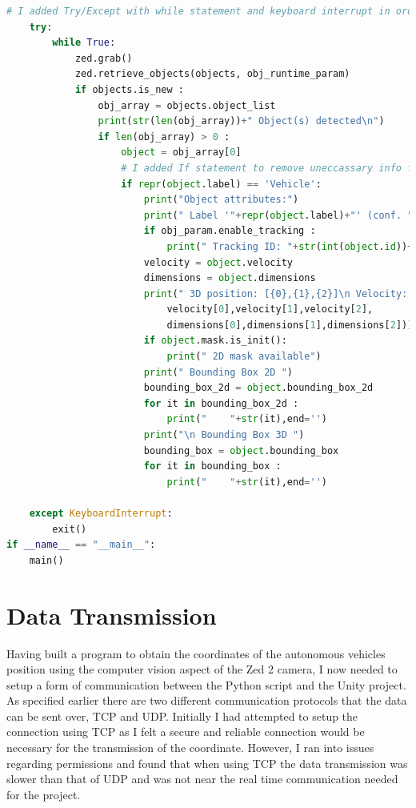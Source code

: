 \documentclass{l4proj}
\begin{document}
\begin{lstlisting}[language=python, float, caption={Python Vehicle Detection Code Part 2, Original Code Without Edits Copyright (c) 2022, STEREOLABS.}, label={lst:code2}]
 # I added Try/Except with while statement and keyboard interrupt in order to allow the script to run indefinitely. 
    try:
        while True:
            zed.grab()
            zed.retrieve_objects(objects, obj_runtime_param)
            if objects.is_new :
                obj_array = objects.object_list
                print(str(len(obj_array))+" Object(s) detected\n")
                if len(obj_array) > 0 :
                    object = obj_array[0]
                    # I added If statement to remove uneccassary info from labels other 'Vehicle'.
                    if repr(object.label) == 'Vehicle':
                        print("Object attributes:")
                        print(" Label '"+repr(object.label)+"' (conf. "+str(int(object.confidence))+"/100)")
                        if obj_param.enable_tracking :
                            print(" Tracking ID: "+str(int(object.id))+" tracking state: "+repr(object.tracking_state)+" / "+repr(object.action_state))
                        velocity = object.velocity
                        dimensions = object.dimensions
                        print(" 3D position: [{0},{1},{2}]\n Velocity: [{3},{4},{5}]\n 3D dimensions: [{6},{7}{8}]".format(position[0],position[1],position[2],
                            velocity[0],velocity[1],velocity[2],
                            dimensions[0],dimensions[1],dimensions[2]))
                        if object.mask.is_init():
                            print(" 2D mask available")
                        print(" Bounding Box 2D ")
                        bounding_box_2d = object.bounding_box_2d
                        for it in bounding_box_2d :
                            print("    "+str(it),end='')
                        print("\n Bounding Box 3D ")
                        bounding_box = object.bounding_box
                        for it in bounding_box :
                            print("    "+str(it),end='')

    except KeyboardInterrupt:
        exit()
if __name__ == "__main__":
    main()
\end{lstlisting}


\section{Data Transmission}

Having built a program to obtain the coordinates of the autonomous vehicles position using the computer vision aspect of the Zed 2 camera, I now needed to setup a form of communication between the Python script and the Unity project. As specified earlier there are two different communication protocols that the data can be sent over, TCP and UDP. Initially I had attempted to setup the connection using TCP as I felt a secure and reliable connection would be necessary for the transmission of the coordinate. However, I ran into issues regarding permissions and found that when using TCP the data transmission was slower than that of UDP and was not near the real time communication needed for the project.
\end{document}
